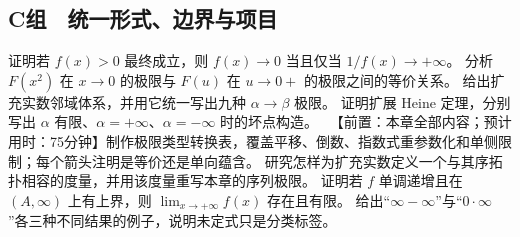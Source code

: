 \subsection*{C组　统一形式、边界与项目}
\begin{enumerate}[label=\textbf{16.\arabic*.},resume]
  \mustdo 证明若 \(f(x)>0\) 最终成立，则 \(f(x)\to0\) 当且仅当 \(1/f(x)\to+\infty\)。
  \mustdo 分析 \(F(x^2)\) 在 \(x\to0\) 的极限与 \(F(u)\) 在 \(u\to0+\) 的极限之间的等价关系。
  \optionaldo 给出扩充实数邻域体系，并用它统一写出九种 \(\alpha\to\beta\) 极限。
  \optionaldo 证明扩展 Heine 定理，分别写出 \(\alpha\) 有限、\(\alpha=+\infty\)、\(\alpha=-\infty\) 时的坏点构造。
  \projectdo\ 【前置：本章全部内容；预计用时：75分钟】制作极限类型转换表，覆盖平移、倒数、指数式重参数化和单侧限制；每个箭头注明是等价还是单向蕴含。
  \opendo 研究怎样为扩充实数定义一个与其序拓扑相容的度量，并用该度量重写本章的序列极限。
  \mustdo 证明若 \(f\) 单调递增且在 \((A,\infty)\) 上有上界，则 \(\lim_{x\to+\infty}f(x)\) 存在且有限。
  \optionaldo 给出“\(\infty-\infty\)”与“\(0\cdot\infty\)”各三种不同结果的例子，说明未定式只是分类标签。
\end{enumerate}
